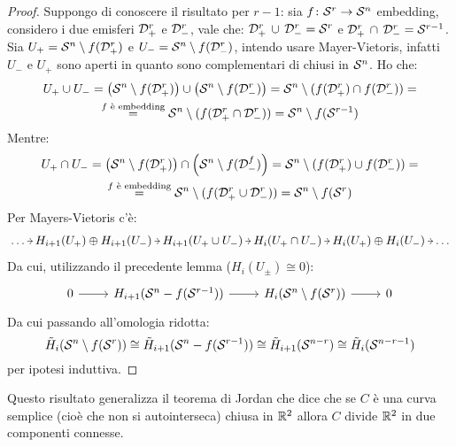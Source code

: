 \begin{proof}
  Suppongo di conoscere il risultato per $ r - 1 $: sia
  $ f \colon \mathcal{S}^{r} \to \mathcal{S}^{n} $ embedding, considero i due emisferi
  $ \mathcal{D}^{r}_+ $ e $ \mathcal{D}^{r}_- $, vale che:
  $ \mathcal{D}^{r}_+ \, \cup \, \mathcal{D}^{r}_- = \mathcal{S}^{r} $ e
  $ \mathcal{D}^{r}_+ \, \cap \, \mathcal{D}^{r}_- = \mathcal{S}^{r-1} $. Sia
  $ U_+ = \mathcal{S}^{n} \setminus f(\mathcal{D}^{r}_+) $ e
  $ U_- = \mathcal{S}^{n} \setminus f(\mathcal{D}^{r}_-) $, intendo usare Mayer-Vietoris, infatti $ U_- $ e
  $ U_+ $ sono aperti in quanto sono complementari di chiusi in $ \mathcal{S}^{n} $.
  Ho che:
  \begin{gather*}
    U_+ \cup U_- = \left(\mathcal{S}^{n} \setminus f(\mathcal{D}^{r}_+) \right) \cup \left( \mathcal{S}^{n} \setminus f(\mathcal{D}^{r}_-) \right) =
    \mathcal{S}^{n} \setminus (f(\mathcal{D}^{r}_+) \cap  f(\mathcal{D}^{r}_-)) = \\
   \overset{\text{$ f $ è embedding}} {=}  \mathcal{S}^{n} \setminus (f(\mathcal{D}^{r}_+  \cap  \mathcal{D}^{r}_-)) = \mathcal{S}^{n} \setminus f(\mathcal{S}^{r-1})
  \end{gather*}
  Mentre:
  \begin{gather*}
    U_+ \cap U_- = \left(\mathcal{S}^{n} \setminus f(\mathcal{D}^{r}_+) \right) \cap \left(\mathcal{S}^{n} \setminus f(\mathcal{D}^{f}_-) \right) =
    \mathcal{S}^{n} \setminus (f(\mathcal{D}^{r}_+) \cup  f(\mathcal{D}^{r}_-)) = \\
    \overset{\text{$ f $ è embedding}} {=}  \mathcal{S}^{n} \setminus (f(\mathcal{D}^{r}_+  \cup  \mathcal{D}^{r}_-)) = \mathcal{S}^{n} \setminus f(\mathcal{S}^{r})
  \end{gather*}
  Per Mayers-Vietoris c'è:
  \[
    \begin{tikzcd}[nodes={column sep = 5pt, inner sep = 2pt}]
      \dots \rar & H_{i+1}(U_+) \oplus H_{i+1}(U_-) \rar & H_{i+1}(U_+ \cup U_-) \rar & H_i(U_+ \cap U_-) \rar & H_i (U_+) \oplus H_i(U_-)
      \rar & \dots
    \end{tikzcd}
  \]
  Da cui, utilizzando il precedente lemma ($ H_i(U_\pm) \cong 0 $):
  \[
    \begin{tikzcd}
      0 \rar & H_{i+1}(\Sph{n} - f(\Sph{r-1})) \rar & H_i(\Sph{n} \setminus f(\Sph{r})) \rar & 0
    \end{tikzcd}
  \]
  Da cui passando all'omologia ridotta:
  \[
    \tilde{H}_i(\mathcal{S}^{n} \setminus f(\mathcal{S}^{r})) \cong \tilde{H}_{i+1}(\mathcal{S}^{n} - f(\mathcal{S}^{r-1})) \cong \tilde{H}_{i+1}(\mathcal{S}^{n-r}) \cong \tilde{H}_i(\mathcal{S}^{n-r-1})
  \]
  per ipotesi induttiva.
\end{proof}
\eproof
Questo risultato generalizza il teorema di Jordan che
dice che se $ C $ è una curva semplice (cioè che non si autointerseca) chiusa in
$ \mathbb{R}^{2} $ allora $ C $ divide $ \mathbb{R}^{2} $ in due componenti connesse.

